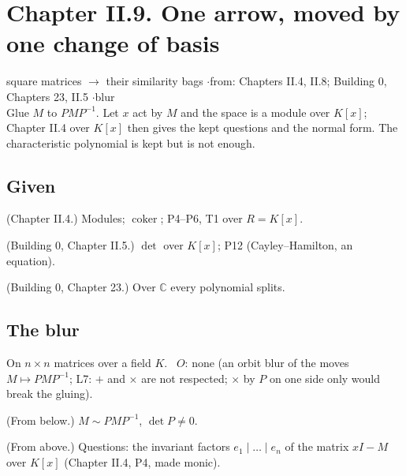 \section*{Chapter II.9. One arrow, moved by one change of basis}
\begin{center}
{\normalsize square matrices $\to$ their similarity bags \quad$\cdot$\quad from: Chapters II.4, II.8; Building 0, Chapters 23, II.5 \quad$\cdot$\quad blur}\\[4pt]
{\small Glue $M$ to $PMP^{-1}$. Let $x$ act by $M$ and the space is a module over $K[x]$; Chapter II.4 over $K[x]$ then gives the kept questions and the normal form. The characteristic polynomial is kept but is not enough.}
\end{center}

\subsection*{Given}

\begin{lines}
\item[\lab{G1}] (Chapter II.4.) Modules; $\operatorname{coker}$; P4--P6, T1 over $R = K[x]$.
\item[\lab{G2}] (Building 0, Chapter II.5.) $\det$ over $K[x]$; P12 (Cayley--Hamilton, an equation).
\item[\lab{G3}] (Building 0, Chapter 23.) Over $\mathbb{C}$ every polynomial splits.
\end{lines}

\subsection*{The blur}

On $n \times n$ matrices over a field $K$. \ $O$: none (an orbit blur of the moves $M \mapsto PMP^{-1}$; L7: $+$ and $\times$ are not respected; $\times$ by $P$ on one side only would break the gluing).

\begin{lines}
\item[\lab{B1}] (From below.) $M \sim PMP^{-1}$, $\det P \ne 0$.
\item[\lab{B2}] (From above.) Questions: the invariant factors $e_1 \mid \dots \mid e_n$ of the matrix $xI - M$ over $K[x]$ (Chapter II.4, P4, made monic).
\end{lines}

